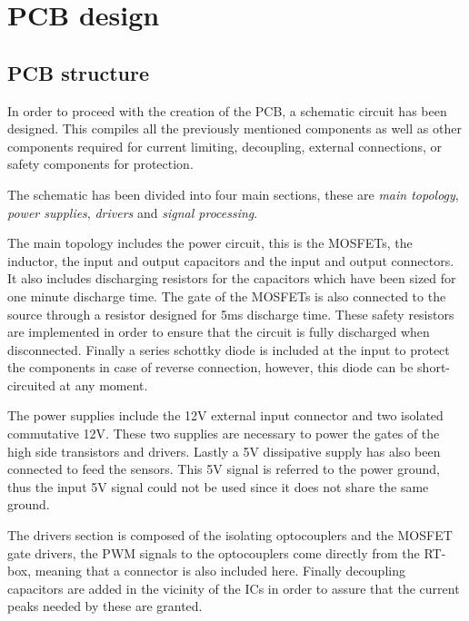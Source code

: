 \section{PCB design}
\subsection{PCB structure} \label{PCB_Schematic}
In order to proceed with the creation of the PCB, a schematic circuit has been designed. This compiles all the previously mentioned components as well as other components required for current limiting, decoupling, external connections, or safety components for protection.

The schematic has been divided into four main sections, these are \textit{main topology}, \textit{power supplies}, \textit{drivers} and \textit{signal processing}.

The main topology includes the power circuit, this is the MOSFETs, the inductor, the input and output capacitors and the input and output connectors. It also includes discharging resistors for the capacitors which have been sized for one minute discharge time. The gate of the MOSFETs is also connected to the source through a resistor designed for 5ms discharge time. These safety resistors are implemented in order to ensure that the circuit is fully discharged when disconnected. Finally a series schottky diode is included at the input to protect the components in case of reverse connection, however, this diode can be short-circuited at any moment. 

The power supplies include the 12V external input connector and two isolated commutative 12V. These two supplies are necessary to power the gates of the high side transistors and drivers. Lastly a 5V dissipative supply has also been connected to feed the sensors. This 5V signal is referred to the power ground, thus the input 5V signal could not be used since it does not share the same ground.

The drivers section is composed of the isolating optocouplers and the MOSFET gate drivers, the PWM signals to the optocouplers come directly from the RT-box, meaning that a connector is also included here. Finally decoupling capacitors are added in the vicinity of the ICs  in order to assure that the current peaks needed by these are granted. 

